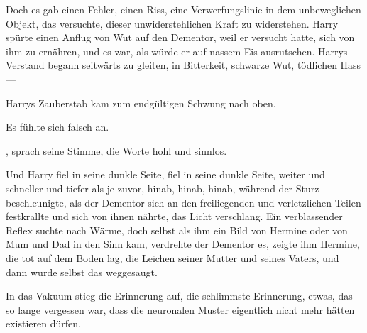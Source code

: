 Doch es gab einen Fehler, einen Riss, eine Verwerfungslinie in dem unbeweglichen Objekt, das versuchte, dieser unwiderstehlichen Kraft zu widerstehen. Harry spürte einen Anflug von Wut auf den Dementor, weil er versucht hatte, sich von ihm zu ernähren, und es war, als würde er auf nassem Eis ausrutschen. Harrys Verstand begann seitwärts zu gleiten, in Bitterkeit, schwarze Wut, tödlichen Hass —

Harrys Zauberstab kam zum endgültigen Schwung nach oben.

Es fühlte sich falsch an.

, sprach seine Stimme, die Worte hohl und sinnlos.

Und Harry fiel in seine dunkle Seite, fiel in seine dunkle Seite, weiter und schneller und tiefer als je zuvor, hinab, hinab, hinab, während der Sturz beschleunigte, als der Dementor sich an den freiliegenden und verletzlichen Teilen festkrallte und sich von ihnen nährte, das Licht verschlang. Ein verblassender Reflex suchte nach Wärme, doch selbst als ihm ein Bild von Hermine oder von Mum und Dad in den Sinn kam, verdrehte der Dementor es, zeigte ihm Hermine, die tot auf dem Boden lag, die Leichen seiner Mutter und seines Vaters, und dann wurde selbst das weggesaugt.

In das Vakuum stieg die Erinnerung auf, die schlimmste Erinnerung, etwas, das so lange vergessen war, dass die neuronalen Muster eigentlich nicht mehr hätten existieren dürfen.

